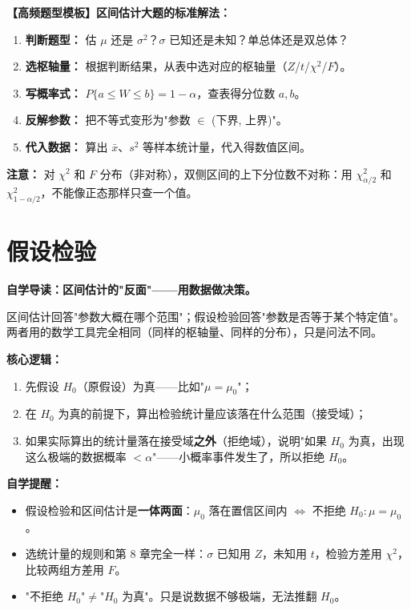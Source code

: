 ﻿\documentclass[lang=cn,11pt]{elegantbook}
\begin{document}
\begin{note}
\textbf{【高频题型模板】区间估计大题的标准解法：}
\begin{enumerate}
    \item \textbf{判断题型：} 估 $\mu$ 还是 $\sigma^2$？$\sigma$ 已知还是未知？单总体还是双总体？
    \item \textbf{选枢轴量：} 根据判断结果，从表中选对应的枢轴量（$Z$/$t$/$\chi^2$/$F$）。
    \item \textbf{写概率式：} $P\{a\leq W\leq b\}=1-\alpha$，查表得分位数 $a,b$。
    \item \textbf{反解参数：} 把不等式变形为"参数 $\in$ (下界, 上界)"。
    \item \textbf{代入数据：} 算出 $\bar x$、$s^2$ 等样本统计量，代入得数值区间。
\end{enumerate}
\textbf{注意：} 对 $\chi^2$ 和 $F$ 分布（非对称），双侧区间的上下分位数不对称：用 $\chi^2_{\alpha/2}$ 和 $\chi^2_{1-\alpha/2}$，不能像正态那样只查一个值。
\end{note}


\chapter{假设检验}

\begin{note}
\textbf{自学导读：区间估计的"反面"——用数据做决策。}

区间估计回答"参数大概在哪个范围"；假设检验回答"参数是否等于某个特定值"。两者用的数学工具完全相同（同样的枢轴量、同样的分布），只是问法不同。

\textbf{核心逻辑：}
\begin{enumerate}
    \item 先假设 $H_0$（原假设）为真——比如"$\mu=\mu_0$"；
    \item 在 $H_0$ 为真的前提下，算出检验统计量应该落在什么范围（接受域）；
    \item 如果实际算出的统计量落在接受域\textbf{之外}（拒绝域），说明"如果 $H_0$ 为真，出现这么极端的数据概率 $<\alpha$"——小概率事件发生了，所以拒绝 $H_0$。
\end{enumerate}

\textbf{自学提醒：}
\begin{itemize}
    \item 假设检验和区间估计是\textbf{一体两面}：$\mu_0$ 落在置信区间内 $\iff$ 不拒绝 $H_0:\mu=\mu_0$。
    \item 选统计量的规则和第 8 章完全一样：$\sigma$ 已知用 $Z$，未知用 $t$，检验方差用 $\chi^2$，比较两组方差用 $F$。
    \item "不拒绝 $H_0$"$\neq$"$H_0$ 为真"。只是说数据不够极端，无法推翻 $H_0$。
\end{itemize}
\end{note}
\end{document}
